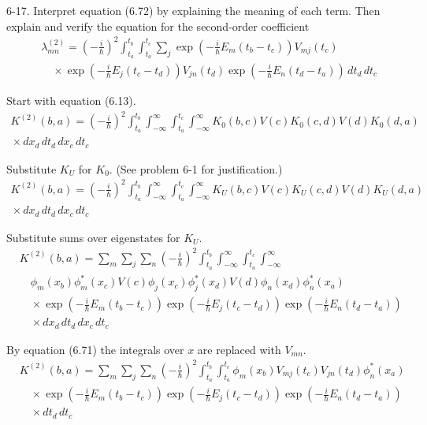 \documentclass[12pt]{article}
\begin{document}
6-17.
Interpret equation (6.72) by explaining the meaning of each term.
Then explain and verify the equation for the second-order coefficient
\begin{align*}
&\lambda_{mn}^{(2)}=\left(-\frac{i}{\hbar}\right)^2
\int_{t_a}^{t_b}
\int_{t_a}^{t_c}
\sum_j
\exp\left(-\frac{i}{\hbar}E_m(t_b-t_c)\right)V_{mj}(t_c)
\\
&\quad{}\times\exp\left(-\frac{i}{\hbar}E_j(t_c-t_d)\right)V_{jn}(t_d)
\exp\left(-\frac{i}{\hbar}E_n(t_d-t_a)\right)\,dt_d\,dt_c
\tag{6.74}
\end{align*}

Start with equation (6.13).
\begin{multline*}
K^{(2)}(b,a)=\left(-\frac{i}{\hbar}\right)^2
\int_{t_a}^{t_b}
\int_{-\infty}^\infty
\int_{t_a}^{t_c}
\int_{-\infty}^\infty
K_0(b,c)V(c)K_0(c,d)V(d)K_0(d,a)
\\
{}\times dx_d\,dt_d\,dx_c\,dt_c
\end{multline*}

Substitute $K_U$ for $K_0$.
(See problem 6-1 for justification.)
\begin{multline*}
K^{(2)}(b,a)=\left(-\frac{i}{\hbar}\right)^2
\int_{t_a}^{t_b}
\int_{-\infty}^\infty
\int_{t_a}^{t_c}
\int_{-\infty}^\infty
K_U(b,c)V(c)K_U(c,d)V(d)K_U(d,a)
\\
{}\times dx_d\,dt_d\,dx_c\,dt_c
\end{multline*}

Substitute sums over eigenstates for $K_U$.
\begin{align*}
&K^{(2)}(b,a)=\sum_m\sum_j\sum_n
\left(-\frac{i}{\hbar}\right)^2
\int_{t_a}^{t_b}
\int_{-\infty}^\infty
\int_{t_a}^{t_c}
\int_{-\infty}^\infty
\\
&\quad\phi_m(x_b)\phi_m^*(x_c)V(c)\phi_j(x_c)\phi_j^*(x_d)V(d)\phi_n(x_d)\phi_n^*(x_a)
\\
&\quad\times
\exp\left(-\frac{i}{\hbar}E_m(t_b-t_c)\right)
\exp\left(-\frac{i}{\hbar}E_j(t_c-t_d)\right)
\exp\left(-\frac{i}{\hbar}E_n(t_d-t_a)\right)
\\
&\quad{}\times dx_d\,dt_d\,dx_c\,dt_c
\end{align*}

By equation (6.71) the integrals over $x$ are replaced with $V_{mn}$.
\begin{align*}
&K^{(2)}(b,a)=\sum_m\sum_j\sum_n
\left(-\frac{i}{\hbar}\right)^2
\int_{t_a}^{t_b}
\int_{t_a}^{t_c}
\phi_m(x_b)V_{mj}(t_c)V_{jn}(t_d)\phi_n^*(x_a)
\\
&\quad\times
\exp\left(-\frac{i}{\hbar}E_m(t_b-t_c)\right)
\exp\left(-\frac{i}{\hbar}E_j(t_c-t_d)\right)
\exp\left(-\frac{i}{\hbar}E_n(t_d-t_a)\right)
\\
&\quad{}\times dt_d\,dt_c
\end{align*}
\end{document}
